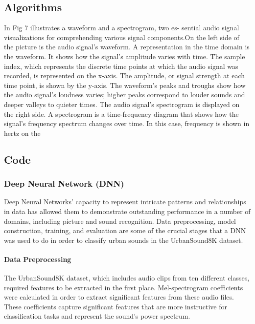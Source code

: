 \documentclass[conference]{IEEEtran}
\begin{document}
\subsection{Algorithms}
In Fig 7 illustrates a waveform and a spectrogram, two es-
sential audio signal visualizations for comprehending various
signal components.On the left side of the picture is the audio
signal’s waveform. A representation in the time domain is the
waveform. It shows how the signal’s amplitude varies with
time. The sample index, which represents the discrete time
points at which the audio signal was recorded, is represented
on the x-axis. The amplitude, or signal strength at each time
point, is shown by the y-axis. The waveform’s peaks and
troughs show how the audio signal’s loudness varies; higher
peaks correspond to louder sounds and deeper valleys to
quieter times. The audio signal’s spectrogram is displayed
on the right side. A spectrogram is a time-frequency diagram
that shows how the signal’s frequency spectrum changes over
time. In this case, frequency is shown in hertz on the

\subsection{Code}

\subsubsection{Deep Neural Network (DNN)}
Deep Neural Networks' capacity to represent intricate patterns and relationships in data has allowed them to demonstrate outstanding performance in a number of domains, including picture and sound recognition. \cite{ca2023922991}Data preprocessing, model construction, training, and evaluation are some of the crucial stages that a DNN was used to do in order to classify urban sounds in the UrbanSound8K dataset.

\paragraph{Data Preprocessing}

The UrbanSound8K dataset, which includes audio clips from ten different classes, required features to be extracted in the first place. Mel-spectrogram coefficients were calculated in order to extract significant features from these audio files. These coefficients capture significant features that are more instructive for classification tasks and represent the sound's power spectrum.
\end{document}
